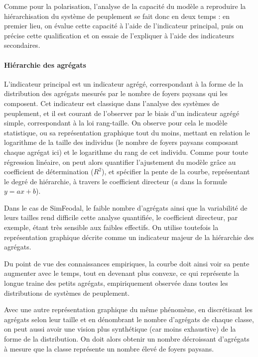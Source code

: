 Comme pour la polarisation, l'analyse de la capacité du modèle a reproduire la hiérarchisation du système de peuplement se fait donc en deux temps : en premier lieu, on évalue cette capacité à l'aide de l'indicateur principal, puis on précise cette qualification et on essaie de l'expliquer à l'aide des indicateurs secondaires.


\paragraph{Hiérarchie des agrégats}

L'indicateur principal est un indicateur agrégé, correspondant à la forme de la distribution des agrégats mesurés par le nombre de foyers paysans qui les composent. Cet indicateur est classique dans l'analyse des systèmes de peuplement, et il est courant de l'observer par le biais d'un indicateur agrégé simple, correspondant à la loi rang-taille. On observe pour cela le modèle statistique, ou sa représentation graphique tout du moins, mettant en relation le logarithme de la taille des individus (le nombre de foyers paysans composant chaque agrégat ici) et le logarithme du rang de cet individu. Comme pour toute régression linéaire, on peut alors quantifier l'ajustement du modèle grâce au coefficient de détermination ($R^2$), et spécifier la pente de la courbe, représentant le degré de hiérarchie, à travers le coefficient directeur ($a$ dans la formule $y = ax + b$).

Dans le cas de SimFeodal, le faible nombre d'agrégats ainsi que la variabilité de leurs tailles rend difficile cette analyse quantifiée, le coefficient directeur, par exemple, étant très sensible aux faibles effectifs. On utilise toutefois la représentation graphique décrite comme un indicateur majeur de la hiérarchie des agrégats.

Du point de vue des connaissances empiriques, la courbe doit ainsi voir sa pente augmenter avec le temps, tout en devenant plus convexe, ce qui représente la \og longue traine\fg{} des petits agrégats, empiriquement observée dans toutes les distributions de systèmes de peuplement.

Avec une autre représentation graphique du même phénomène, en discrétisant les agrégats selon leur taille et en dénombrant le nombre d'agrégats de chaque classe, on peut aussi avoir une vision plus synthétique (car moins exhaustive) de la forme de la distribution. On doit alors obtenir un nombre décroissant d'agrégats à mesure que la classe représente un nombre élevé de foyers paysans.

